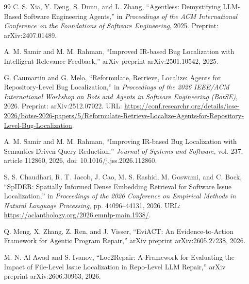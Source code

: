 \documentclass[3p,times,procedia]{elsarticle}
\begin{document}
\begin{thebibliography}{99}
C. S. Xia, Y. Deng, S. Dunn, and L. Zhang, ``Agentless: Demystifying LLM-Based Software Engineering Agents,'' in \emph{Proceedings of the ACM International Conference on the Foundations of Software Engineering}, 2025. Preprint: arXiv:2407.01489.

A. M. Samir and M. M. Rahman, ``Improved IR-based Bug Localization with Intelligent Relevance Feedback,'' arXiv preprint arXiv:2501.10542, 2025.

G. Caumartin and G. Melo, ``Reformulate, Retrieve, Localize: Agents for Repository-Level Bug Localization,'' in \emph{Proceedings of the 2026 IEEE/ACM International Workshop on Bots and Agents in Software Engineering (BotSE)}, 2026. Preprint: arXiv:2512.07022. URL: \url{https://conf.researchr.org/details/icse-2026/botse-2026-papers/5/Reformulate-Retrieve-Localize-Agents-for-Repository-Level-Bug-Localization}.

A. M. Samir and M. M. Rahman, ``Improving IR-based Bug Localization with Semantics-Driven Query Reduction,'' \emph{Journal of Systems and Software}, vol. 237, article 112860, 2026, doi: 10.1016/j.jss.2026.112860.

S. S. Chaudhari, R. T. Jacob, J. Cao, M. S. Rashid, M. Goswami, and C. Bock, ``SpIDER: Spatially Informed Dense Embedding Retrieval for Software Issue Localization,'' in \emph{Proceedings of the 2026 Conference on Empirical Methods in Natural Language Processing}, pp. 44096--44131, 2026. URL: \url{https://aclanthology.org/2026.emnlp-main.1938/}.

Q. Meng, X. Zhang, Z. Ren, and J. Visser, ``EviACT: An Evidence-to-Action Framework for Agentic Program Repair,'' arXiv preprint arXiv:2605.27238, 2026.

M. N. Al Awad and S. Ivanov, ``Loc2Repair: A Framework for Evaluating the Impact of File-Level Issue Localization in Repo-Level LLM Repair,'' arXiv preprint arXiv:2606.30963, 2026.
\end{thebibliography}
\end{document}
